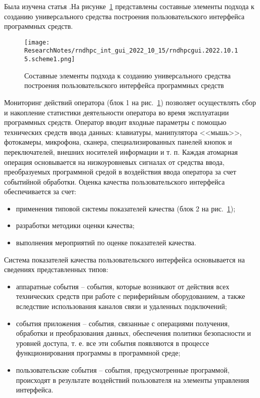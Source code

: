 \def\notedate{2022.10.15}
\def\currentauthor{Василян А.Р. (РК6-73Б)}


Была изучена статья \cite{Kazakov2020}.На рисунке~\ref{rndhpcgui.2022.10.15.scheme1} представлены составные элементы подхода к созданию универсального средства построения пользовательского интерфейса программных средств.

\begin{figure}[!ht]
  \centering
  \texttt{[image: ResearchNotes/rndhpc\_int\_gui\_2022\_10\_15/rndhpcgui.2022.10.15.scheme1.png]}
  \caption{Составные элементы подхода к созданию универсального средства построения пользовательского интерфейса программных средств}
  \label{rndhpcgui.2022.10.15.scheme1}
\end{figure}

Мониторинг действий оператора (блок 1 на рис.~\ref{rndhpcgui.2022.10.15.scheme1}) позволяет осуществлять сбор и накопление статистики деятельности оператора во время эксплуатации программных средств. Оператор вводит входные параметры с помощью технических средств ввода данных: клавиатуры, манипулятора <<мышь>>, фотокамеры, микрофона, сканера, специализированных панелей кнопок и переключателей, внешних носителей информации и т. п. Каждая атомарная операция основывается на низкоуровневых сигналах от средства ввода, преобразуемых программной средой в воздействия ввода оператора за счет событийной обработки.
Оценка качества пользовательского интерфейса обеспечивается за счет:
\begin{itemize}
	\item применения типовой системы показателей качества (блок 2 на рис.~\ref{rndhpcgui.2022.10.15.scheme1});
	\item разработки методики оценки качества;
	\item выполнения мероприятий по оценке показателей качества.
\end{itemize}

	Система показателей качества пользовательского интерфейса основывается на сведениях представленных типов:
\begin{itemize}
	\item аппаратные события -- события, которые возникают от действия всех технических средств при работе с периферийным оборудованием, а также вследствие использования каналов связи и удаленных подключений;
	\item события приложения -- события, связанные с операциями получения, обработки и преобразования данных, обеспечения политики безопасности и уровней доступа, т. е. все эти события появляются в процессе функционирования программы в программной среде;
	\item пользовательские события -- события, предусмотренные программой, происходят в результате воздействий пользователя на элементы управления интерфейса.
\end{itemize}

